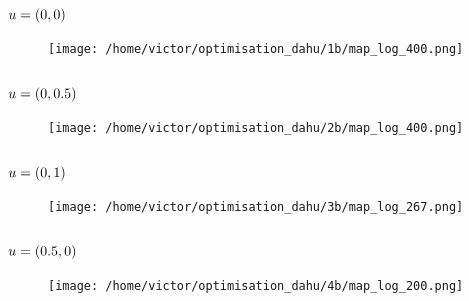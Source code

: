\documentclass[../../Main_ManuscritThese.tex]{subfiles}
\begin{document}
\subsection*{$u=(0, 0)$}
\begin{figure}[ht]
  \centering
  \texttt{[image: /home/victor/optimisation\_dahu/1b/map\_log\_400.png]}
\end{figure}
\begin{figure}[ht]
  \centering
  \resizebox{1\textwidth}{!}{}
\end{figure}
\clearpage

\subsection*{$u=(0, 0.5)$}
\begin{figure}[ht]
  \centering
  \texttt{[image: /home/victor/optimisation\_dahu/2b/map\_log\_400.png]}
\end{figure}
\begin{figure}[ht]
  \centering
    \resizebox{1\textwidth}{!}{}
\end{figure}
\clearpage
\subsection*{$u=(0, 1)$}
\begin{figure}[ht]
  \centering
  \texttt{[image: /home/victor/optimisation\_dahu/3b/map\_log\_267.png]}
\end{figure}
\begin{figure}[ht]
  \centering
  \resizebox{1\textwidth}{!}{}
\end{figure}
\clearpage
\subsection*{$u=(0.5, 0)$}
\begin{figure}[ht]
  \centering
  \texttt{[image: /home/victor/optimisation\_dahu/4b/map\_log\_200.png]}
\end{figure}
\begin{figure}[ht]
  \centering
  \resizebox{1\textwidth}{!}{}
\end{figure}
\clearpage
\end{document}
